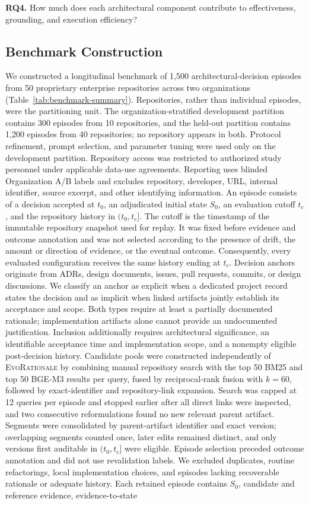 \documentclass[10pt,conference]{IEEEtran}
\begin{document}
\noindent\textbf{RQ4.} How much does each architectural component contribute to effectiveness, grounding, and execution efficiency?


\subsection{Benchmark Construction}
\label{sec:benchmark-construction}

We constructed a longitudinal benchmark of 1,500 architectural-decision episodes from 50 proprietary enterprise repositories across two organizations (Table~\ref{tab:benchmark-summary}). Repositories, rather than individual episodes, were the partitioning unit. The organization-stratified development partition contains 300 episodes from 10 repositories, and the held-out partition contains 1,200 episodes from 40 repositories; no repository appears in both. Protocol refinement, prompt selection, and parameter tuning were used only on the development partition. Repository access was restricted to authorized study personnel under applicable data-use agreements. Reporting uses blinded Organization A/B labels and excludes repository, developer, URL, internal identifier, source excerpt, and other identifying information. An episode consists of a decision accepted at $t_0$, an adjudicated initial state $S_0$, an evaluation cutoff $t_c$, and the repository history in $(t_0,t_c]$. The cutoff is the timestamp of the immutable repository snapshot used for replay. It was fixed before evidence and outcome annotation and was not selected according to the presence of drift, the amount or direction of evidence, or the eventual outcome. Consequently, every evaluated configuration receives the same history ending at $t_c$. Decision anchors originate from ADRs, design documents, issues, pull requests, commits, or design discussions. We classify an anchor as explicit when a dedicated project record states the decision and as implicit when linked artifacts jointly establish its acceptance and scope. Both types require at least a partially documented rationale; implementation artifacts alone cannot provide an undocumented justification. Inclusion additionally requires architectural significance, an identifiable acceptance time and implementation scope, and a nonempty eligible post-decision history. Candidate pools were constructed independently of \textsc{EvoRationale} by combining manual repository search with the top 50 BM25 and top 50 BGE-M3 results per query, fused by reciprocal-rank fusion with $k=60$, followed by exact-identifier and repository-link expansion. Search was capped at 12 queries per episode and stopped earlier after all direct links were inspected, and two consecutive reformulations found no new relevant parent artifact. Segments were consolidated by parent-artifact identifier and exact version; overlapping segments counted once, later edits remained distinct, and only versions first auditable in $(t_0,t_c]$ were eligible. Episode selection preceded outcome annotation and did not use revalidation labels. We excluded duplicates, routine refactorings, local implementation choices, and episodes lacking recoverable rationale or adequate history. Each retained episode contains $S_0$, candidate and reference evidence, evidence-to-state 
\end{document}
